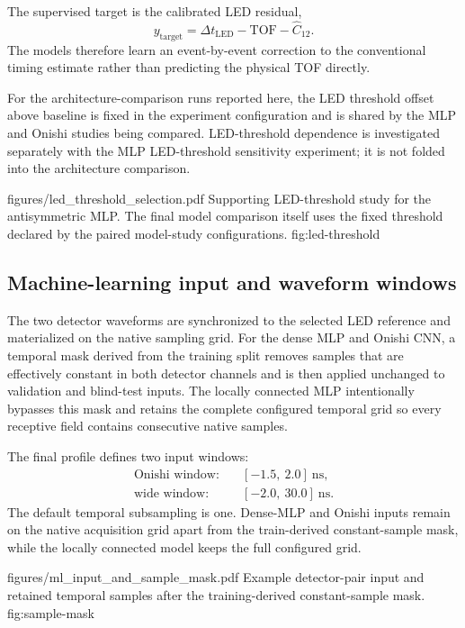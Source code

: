 The supervised target is the calibrated LED residual,
\begin{equation}
    y_{\mathrm{target}}
    =
    \Delta t_{\mathrm{LED}}
    -
    \mathrm{TOF}
    -
    \widehat{C}_{12}.
\end{equation}
The models therefore learn an event-by-event correction to the conventional timing estimate rather than predicting the physical TOF directly.

For the architecture-comparison runs reported here, the LED threshold offset above baseline is fixed in the experiment configuration and is shared by the MLP and Onishi studies being compared. LED-threshold dependence is investigated separately with the MLP LED-threshold sensitivity experiment; it is not folded into the architecture comparison.

\reportfigure
    {figures/led_threshold_selection.pdf}
    {Supporting LED-threshold study for the antisymmetric MLP. The final model comparison itself uses the fixed threshold declared by the paired model-study configurations.}
    {fig:led-threshold}

\subsection{Machine-learning input and waveform windows}

The two detector waveforms are synchronized to the selected LED reference and materialized on the native sampling grid. For the dense MLP and Onishi CNN, a temporal mask derived from the training split removes samples that are effectively constant in both detector channels and is then applied unchanged to validation and blind-test inputs. The locally connected MLP intentionally bypasses this mask and retains the complete configured temporal grid so every receptive field contains consecutive native samples.

The final profile defines two input windows:
\begin{align}
    \text{Onishi window:}\quad &[-1.5,\ 2.0]\ \mathrm{ns},\\
    \text{wide window:}\quad &[-2.0,\ 30.0]\ \mathrm{ns}.
\end{align}
The default temporal subsampling is one. Dense-MLP and Onishi inputs remain on the native acquisition grid apart from the train-derived constant-sample mask, while the locally connected model keeps the full configured grid.

\reportfigure
    {figures/ml_input_and_sample_mask.pdf}
    {Example detector-pair input and retained temporal samples after the training-derived constant-sample mask.}
    {fig:sample-mask}

